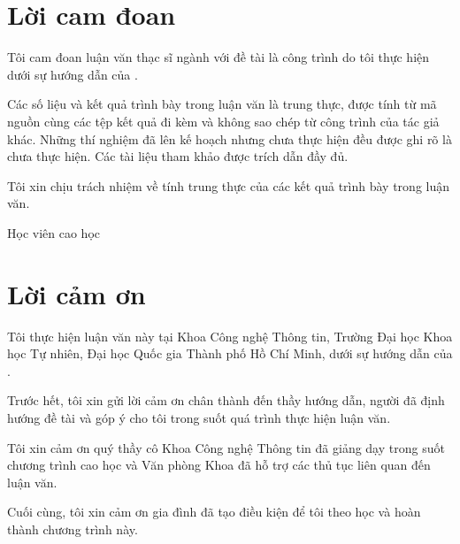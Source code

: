 \chapter*{Lời cam đoan}

Tôi cam đoan luận văn thạc sĩ ngành \Nganh{} với đề tài \textbf{\TenDeTaiMotDong}
là công trình do tôi thực hiện dưới sự hướng dẫn của \GVHD.

Các số liệu và kết quả trình bày trong luận văn là trung thực, được tính từ mã nguồn cùng
các tệp kết quả đi kèm và không sao chép từ công trình của tác giả khác. Những
thí nghiệm đã lên kế hoạch nhưng chưa thực hiện đều được ghi rõ là chưa thực hiện. Các tài liệu
tham khảo được trích dẫn đầy đủ.

Tôi xin chịu trách nhiệm về tính trung thực của các kết quả trình bày trong luận văn.

\vspace{2em}
\begin{flushright}
\begin{minipage}{0.42\textwidth}
\centering
Học viên cao học\\[4em]
\HocVien
\end{minipage}
\end{flushright}
\clearpage

\chapter*{Lời cảm ơn}

Tôi thực hiện luận văn này tại Khoa Công nghệ Thông tin, Trường Đại học Khoa học Tự nhiên,
Đại học Quốc gia Thành phố Hồ Chí Minh, dưới sự hướng dẫn của \GVHD.

Trước hết, tôi xin gửi lời cảm ơn chân thành đến thầy hướng dẫn, người đã định hướng đề
tài và góp ý cho tôi trong suốt quá trình thực hiện luận văn.

Tôi xin cảm ơn quý thầy cô Khoa Công nghệ Thông tin đã giảng dạy trong suốt chương trình
cao học và Văn phòng Khoa đã hỗ trợ các thủ tục liên quan đến luận văn.

Cuối cùng, tôi xin cảm ơn gia đình đã tạo điều kiện để tôi theo học và hoàn thành
chương trình này.

\vspace{2em}
\begin{flushright}
\begin{minipage}{0.60\textwidth}
\centering
\NgayHoanThanh\\[4em]
\HocVien
\end{minipage}
\end{flushright}
\clearpage
